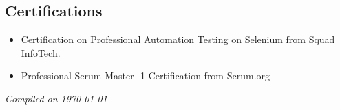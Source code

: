 \documentclass[margin,line]{resume}
\begin{document}
\begin{resume}
\section{\mysidestyle Certifications}
\vspace{0mm}
    \begin{itemize}
        \item Certification on Professional Automation Testing on Selenium from Squad InfoTech.
        \item Professional Scrum Master -1 Certification from Scrum.org
    \end{itemize}
\hfill \textsl{Compiled on \monthyeardate\today}
\end{resume}
\end{document}
